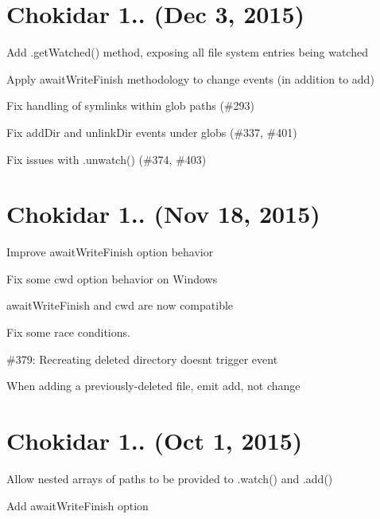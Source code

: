 \section*{Chokidar 1.. (Dec 3, 2015)}


\begin{DoxyItemize}
\item Add {\ttfamily .get\+Watched()} method, exposing all file system entries being watched
\item Apply {\ttfamily await\+Write\+Finish} methodology to {\ttfamily change} events (in addition to {\ttfamily add})
\item Fix handling of symlinks within glob paths (\#293)
\item Fix {\ttfamily add\+Dir} and {\ttfamily unlink\+Dir} events under globs (\#337, \#401)
\item Fix issues with {\ttfamily .unwatch()} (\#374, \#403)
\end{DoxyItemize}

\section*{Chokidar 1.. (Nov 18, 2015)}


\begin{DoxyItemize}
\item Improve {\ttfamily await\+Write\+Finish} option behavior
\item Fix some {\ttfamily cwd} option behavior on Windows
\item {\ttfamily await\+Write\+Finish} and {\ttfamily cwd} are now compatible
\item Fix some race conditions.
\item \#379\+: Recreating deleted directory doesn\textquotesingle{}t trigger event
\item When adding a previously-\/deleted file, emit \textquotesingle{}add\textquotesingle{}, not \textquotesingle{}change\textquotesingle{}
\end{DoxyItemize}

\section*{Chokidar 1.. (Oct 1, 2015)}


\begin{DoxyItemize}
\item Allow nested arrays of paths to be provided to {\ttfamily .watch()} and {\ttfamily .add()}
\item Add {\ttfamily await\+Write\+Finish} option
\end{DoxyItemize}

